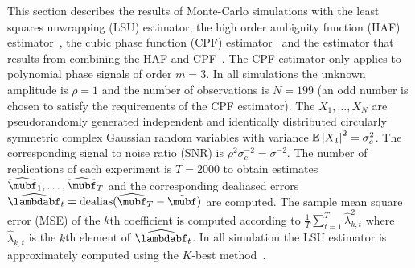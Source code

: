 \documentclass[journal]{IEEEtran}
\begin{document}

This section describes the results of Monte-Carlo simulations with the least squares unwrapping (LSU) estimator, the high order ambiguity function (HAF) estimator~\cite{Peleg_DPT_1995}, the cubic phase function (CPF) estimator~\cite{Oshea_cpf_2004} and the estimator that results from combining the HAF and CPF~\cite{Djurovic_haf_cpf_2012}.  The CPF estimator only applies to polynomial phase signals of order $m=3$.  In all simulations the unknown amplitude is $\rho = 1$ and the number of observations is $N = 199$ (an odd number is chosen to satisfy the requirements of the CPF estimator).  The $X_1, \dots, X_N$ are pseudorandomly generated independent and identically distributed circularly symmetric complex Gaussian random variables with variance ${\mathbb E}\left\vert X_1 \right\vert^2 = \sigma_c^2$.  The corresponding signal to noise ratio (SNR) is $\rho^2 \sigma_c^{-2} = \sigma^{-2}$.  The number of replications of each experiment is $T = 2000$ to obtain estimates $\widehat{\mubf}_1, \dots, \widehat{\mubf}_T$ and the corresponding dealiased errors $\widehat{\lambdabf}_t = \dealias(\widehat{\mubf}_T - \tilde{\mubf})$ are computed.  The sample mean square error (MSE) of the $k$th coefficient is computed according to $\tfrac{1}{T}\sum_{t=1}^T \widehat{\lambda}_{k,t}^2$ where $\widehat{\lambda}_{k,t}$ is the $k$th element of $\widehat{\lambdabf}_t$.  In all simulation the LSU estimator is approximately computed using the $K$-best method~\cite{Zhan2006_K_best_sphere_decoder}.
\end{document}
